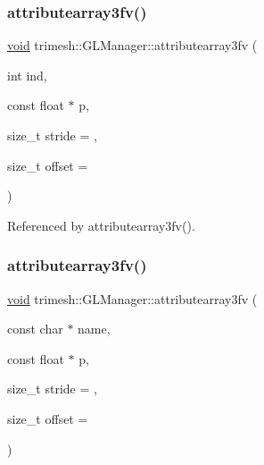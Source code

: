 \subsubsection{\texorpdfstring{attributearray3fv()}{attributearray3fv()}\hspace{0.1cm}{\footnotesize\ttfamily [1/6]}}
{\footnotesize\ttfamily \hyperlink{namespacetrimesh_a784ddfd979e1c579bda795a8edfc3f43}{void} trimesh\+::\+G\+L\+Manager\+::attributearray3fv (\begin{DoxyParamCaption}\item[{int}]{ind,  }\item[{const float $\ast$}]{p,  }\item[{size\+\_\+t}]{stride = {},  }\item[{size\+\_\+t}]{offset = {} }\end{DoxyParamCaption})\hspace{0.3cm}{\ttfamily [inline]}}



Referenced by attributearray3fv().

\mbox{\label{classtrimesh_1_1GLManager_aed6a872172e4440b7538d81ce0cab52d}} 
\subsubsection{\texorpdfstring{attributearray3fv()}{attributearray3fv()}\hspace{0.1cm}{\footnotesize\ttfamily [2/6]}}
{\footnotesize\ttfamily \hyperlink{namespacetrimesh_a784ddfd979e1c579bda795a8edfc3f43}{void} trimesh\+::\+G\+L\+Manager\+::attributearray3fv (\begin{DoxyParamCaption}\item[{const char $\ast$}]{name,  }\item[{const float $\ast$}]{p,  }\item[{size\+\_\+t}]{stride = {},  }\item[{size\+\_\+t}]{offset = {} }\end{DoxyParamCaption})\hspace{0.3cm}{\ttfamily [inline]}}

\mbox{\label{classtrimesh_1_1GLManager_a8bbf7b5485678282f10502a4c91c2e4c}} 
